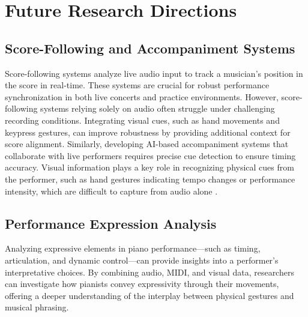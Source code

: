 \documentclass{article}
\begin{document}
\section{Future Research Directions}
\label{sec:future-rsearch-directions}


\subsection{Score-Following and Accompaniment Systems}\label{subsec:score_following}
Score-following systems analyze live audio input to track a musician's position in the score in real-time. These systems are crucial for robust performance synchronization in both live concerts and practice environments. However, score-following systems relying solely on audio often struggle under challenging recording conditions. Integrating visual cues, such as hand movements and keypress gestures, can improve robustness by providing additional context for score alignment. Similarly, developing AI-based accompaniment systems that collaborate with live performers requires precise cue detection to ensure timing accuracy. Visual information plays a key role in recognizing physical cues from the performer, such as hand gestures indicating tempo changes or performance intensity, which are difficult to capture from audio alone \cite{}.


\subsection{Performance Expression Analysis}\label{subsec:performance_expression}
Analyzing expressive elements in piano performance—such as timing, articulation, and dynamic control—can provide insights into a performer's interpretative choices. By combining audio, MIDI, and visual data, researchers can investigate how pianists convey expressivity through their movements, offering a deeper understanding of the interplay between physical gestures and musical phrasing.
\end{document}
